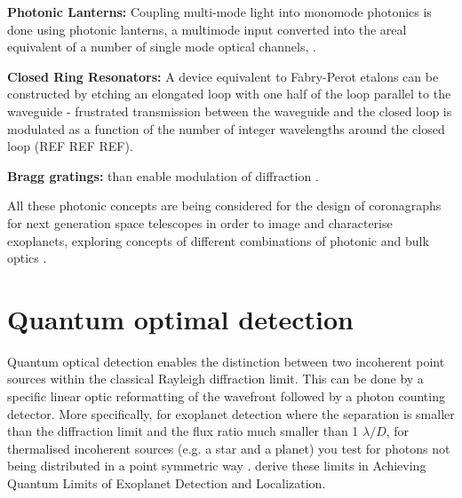 \documentclass[letterpaper]{ar-1col}
\newcommand{\ld}{$\lambda/D$}
\begin{document}
{\bf Photonic Lanterns: } Coupling multi-mode light into monomode photonics is done using photonic lanterns, a multimode input converted into the areal equivalent of a number of single mode optical channels, \citep{Norris22}.

{\bf Closed Ring Resonators: } A device equivalent to Fabry-Perot etalons can be constructed by etching an elongated loop with one half of the loop parallel to the waveguide - frustrated transmission between the waveguide and the closed loop is modulated as a function of the number of integer wavelengths around the closed loop (REF REF REF).

{\bf Bragg gratings: } than enable modulation of diffraction \citep{FaggingerAuer24}.

All these photonic concepts are being considered for the design of coronagraphs for next generation space telescopes in order to image and characterise exoplanets, exploring concepts of different combinations of photonic and bulk optics \citep{Desai23a}.

%


%
%
 



\section{Quantum optimal detection}

Quantum optical detection \citep{Lu18} enables the distinction between two incoherent point sources within the classical Rayleigh diffraction limit.
%
This can be done by a specific linear optic reformatting of the wavefront followed by a photon counting detector.
%
More specifically, for exoplanet detection where the separation is smaller than the diffraction limit and the flux ratio much smaller than 1 \ld{}, for thermalised incoherent sources (e.g. a star and a planet) you test for photons not being distributed in a point symmetric way \citep[e.g. ][]{Huang21}.
%
\citet{Desai23} derive these limits in Achieving Quantum Limits of Exoplanet Detection and Localization.
\end{document}
